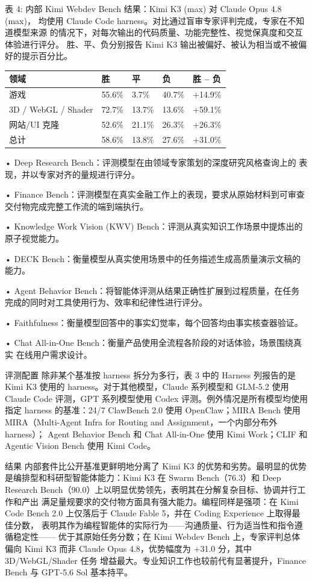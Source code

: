 \documentclass[
  10
]{article}
\newcounter{none} %
\begin{document}
表 4: 内部 Kimi Webdev Bench 结果：Kimi K3 (max) 对 Claude Opus 4.8 (max)，
均使用 Claude Code harness。对比通过盲审专家评判完成，专家在不知道模型来源
的情况下，对每次输出的代码质量、功能完整性、视觉保真度和交互体验进行评分。
胜、平、负分别报告 Kimi K3 输出被偏好、被认为相当或不被偏好的提示百分比。

{\def\LTcaptype{none} %
\begin{longtable}[]{@{}|l|l|l|l|l|@{}}
\toprule\noalign{}
\endhead
\bottomrule\noalign{}
\endlastfoot
\hline
领域 & 胜 & 平 & 负 & 胜 -- 负 \\
\hline
游戏 & 55.6\% & 3.7\% & 40.7\% & +14.9\% \\
\hline
3D / WebGL / Shader & 72.7\% & 13.7\% & 13.6\% & +59.1\% \\
\hline
网站/UI 克隆 & 52.6\% & 21.1\% & 26.3\% & +26.3\% \\
\hline
总计 & 58.6\% & 13.8\% & 27.6\% & +31.0\% \\
\hline
\end{longtable}
}

• Deep Research Bench：评测模型在由领域专家策划的深度研究风格查询上的
表现，并以专家对齐的量规进行评分。

• Finance Bench：评测模型在真实金融工作上的表现，要求从原始材料到可审查
交付物完成完整工作流的端到端执行。

• Knowledge Work Vision (KWV) Bench：评测从真实知识工作场景中提炼出的
原子视觉能力。

• DECK Bench：衡量模型从真实使用场景中的任务描述生成高质量演示文稿的
能力。

• Agent Behavior Bench：将智能体评测从结果正确性扩展到过程质量，在任务
完成的同时对工具使用行为、效率和纪律性进行评分。

• Faithfulness：衡量模型回答中的事实幻觉率，每个回答均由事实核查器验证。

• Chat All-in-One Bench：衡量产品使用全流程各阶段的对话体验，场景围绕真实
在线用户需求设计。

评测配置 除非某个基准按 harness 拆分为多行，表 3 中的 Harness 列报告的是
Kimi K3 使用的 harness。对于其他模型，Claude 系列模型和 GLM-5.2 使用
Claude Code 评测，GPT 系列模型使用 Codex 评测。例外情况是所有模型均使用
指定 harness 的基准：24/7 ClawBench 2.0 使用 OpenClaw；MIRA Bench 使用
MIRA（Multi-Agent Infra for Routing and Assignment，一个内部分布外 harness）；
Agent Behavior Bench 和 Chat All-in-One 使用 Kimi Work；CLIF 和 Agentic
Vision Bench 使用 Kimi Code。

结果 内部套件比公开基准更鲜明地分离了 Kimi K3 的优势和劣势。最明显的优势
是编排型和科研型智能体能力：Kimi K3 在 Swarm Bench（76.3）和 Deep Research
Bench（90.0）上以明显优势领先，表明其在分解复杂目标、协调并行工作和产出
满足量规要求的交付物方面具有强大能力。编程同样是强项：在 Kimi Code Bench
2.0 上仅落后于 Claude Fable 5，并在 Coding Experience 上取得最佳分数，
表明其作为编程智能体的实际行为——沟通质量、行为适当性和指令遵循稳定性——
优于其原始任务分数；在 Kimi Webdev Bench 上，专家评判总体偏向 Kimi K3
而非 Claude Opus 4.8，优势幅度为 +31.0 分，其中 3D/WebGL/Shader 任务
增益最大。专业知识工作也较前代有显著提升，Finance Bench 与 GPT-5.6 Sol
基本持平。
\end{document}
